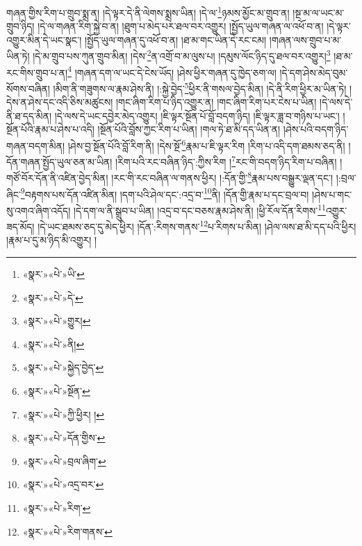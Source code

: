 གཞན་གྱིས་རིག་པ་གྲུབ་སྨྲ་ན། །དེ་ལྟར་དེ་ནི་ལེགས་སྨྲས་ཡིན། །དེ་ལ་\footnote{«སྣར་»«པེ་»ཡི་}ཉམས་མྱོང་མ་གྲུབ་ན། །སྔ་མ་ལ་ཡང་མ་གྲུབ་ཉིད། །དེ་ལ་གཞན་རིག་སྐྱེ་བ་ན། །ཐུག་པ་མེད་པར་ཐལ་བར་འགྱུར། །སྤྱོད་ཡུལ་གཞན་ལ་འཕོ་བ་ན། །དེ་ལྟར་འགྱུར་མིན་དེ་ཡང་སྣང་། །སྤྱོད་ཡུལ་གཞན་དུ་འཕོ་བ་ན། །ཐ་མ་གང་ཡིན་དེ་རང་ངམ། །གཞན་ལས་གྲུབ་པ་མ་ཡིན་ཏེ། །དེ་མ་གྲུབ་པས་ཀུན་གྲུབ་མིན། །དེས་\footnote{«སྣར་»«པེ་»དེ་}ན་འགྲོ་བ་མ་ལུས་པ། །དམུས་ལོང་ཉིད་དུ་ཐལ་བར་འགྱུར།\footnote{«སྣར་»«པེ་»གྱུར།} །ཐ་མ་རང་གིས་གྲུབ་པ་ན།\footnote{«སྣར་»«པེ་»ནི།} །གཞན་དག་ལ་ཡང་དེ་ངེས་ཡོད། །ཤེས་ཕྱིར་གཞན་དུ་ཁྱེད་ཅག་ལ། །དེ་དག་ཤེས་མེད་བུམ་སོགས་བཞིན། །མིག་ནི་གཟུགས་ལ་རྣམ་ཤེས་ནི། །:སྐྱེ་བྱེད་\footnote{«སྣར་»«པེ་»སྐྱེད་བྱེད་}ཕྱིར་ནི་གསལ་བྱེད་མིན། །དེ་ནི་རིག་ཕྱིར་མ་ཡིན་ཏེ། །དེས་ན་ཤེས་དང་འདི་ཅིས་མཚུངས། །གང་ཞིག་རིག་པ་ཉིད་འགྱུར་ན། །གང་ཞིག་རིག་པར་ངེས་པ་ཡིན། །དེ་ལས་དེ་ནི་ཐ་དད་མིན། །དེ་ལས་དེ་ཡང་དབྱེར་མེད་འགྱུར། །ཇི་ལྟར་སྔོན་པོ་བློ་བདག་ཉིད། །ཇི་ལྟར་ཟླ་བ་གཉིས་པ་ཡང་། །སྔོན་པོའི་རྣམ་པ་ཤེས་པ་འདི། །སྔོན་པོའི་བློས་ཀྱང་རིག་པ་ཡིན། །གལ་ཏེ་ཐ་མི་དད་ཡིན་ན། །ཤེས་པའི་བདག་ཉིད་གཞན་བདག་མིན། །ཤེས་བྱ་སྔོན་པོའི་བློ་རིག་ནི། །དེས་སྔོ་\footnote{«སྣར་»«པེ་»སྔོན་}རྣམ་པ་ཇི་ལྟར་རིག །རིག་པ་འདི་དག་ཐམས་ཅད་ནི། །དོན་གཞན་སྤྱོད་ཡུལ་ཅན་མ་ཡིན། །རིག་པའི་རང་བཞིན་ཉིད་:ཀྱིས་རིག །\footnote{«སྣར་»«པེ་»ཀྱི་ཕྱིར། །}རང་གི་བདག་ཉིད་རིག་པ་བཞིན། །གཙོ་བོར་དོན་ནི་འཛིན་བྱེད་མིན། །རང་གི་རང་བཞིན་ལ་གནས་ཕྱིར། །:དོན་གྱི་\footnote{«སྣར་»«པེ་»དོན་གྱིས་}རྣམ་པས་བསྒྱུར་ལྡན་དང་། །:བྲལ་ཞིང་\footnote{«སྣར་»«པེ་»བྲལ་ཞིག་}བརྟགས་པས་དོན་འཛིན་མིན། །དག་པའི་ཤེལ་དང་:འདྲ་བ་\footnote{«སྣར་»«པེ་»འདྲ་བར་}ནི། །དོན་གྱི་རྣམ་པ་དང་བྲལ་བ། །ཤེས་པ་གང་སུ་འགའ་ཞིག་འདོད། །དེ་དག་ལ་ནི་སྒྲུབ་པ་ཡིན། །འདྲ་བ་དང་བཅས་རྣམ་ཤེས་ནི། །ཕྱི་རོལ་དོན་རིགས་\footnote{«སྣར་»«པེ་»རིག་}འགྱུར་ཟད་མོད། །དེ་ཡང་ཐམས་ཅད་དུ་མེད་ཕྱིར། །དོན་:རིགས་གནས་\footnote{«སྣར་»«པེ་»རིག་གནས་}པ་རིགས་པ་མིན། །ཤེལ་ལས་ཐ་མི་དད་པའི་ཕྱིར། །རྣམ་པ་དུ་མ་ཉིད་མི་འགྱུར། །
